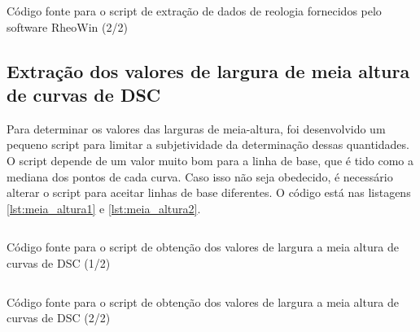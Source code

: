 \begin{listing}[H]
	\inputminted{python}{./python/extracao_reologia2.py}
	\caption{Código fonte para o script de extração de dados de reologia fornecidos pelo software RheoWin (2/2)} 
	\label{lst:extracao_reologia2}
\end{listing}

\subsection{Extração dos valores de largura de meia altura de curvas de DSC}
\label{sec:apendice_DSC}
Para determinar os valores das larguras de meia-altura, foi desenvolvido um pequeno script para limitar a subjetividade da determinação dessas quantidades. O script depende de um valor muito bom para a linha de base, que é tido como a mediana dos pontos de cada curva. Caso isso não seja obedecido, é necessário alterar o script para aceitar linhas de base diferentes. O código está nas listagens \ref{lst:meia_altura1} e \ref{lst:meia_altura2}.

\begin{listing}[H]
	\inputminted{python}{./python/meia_altura1.py}
	\caption{Código fonte para o script de obtenção dos valores de largura a meia altura de curvas de DSC (1/2)} 
	\label{lst:meia_altura1}
\end{listing}

\begin{listing}[H]
	\inputminted{python}{./python/meia_altura2.py}
	\caption{Código fonte para o script de obtenção dos valores de largura a meia altura de curvas de DSC (2/2)} 
	\label{lst:meia_altura2}
\end{listing}

%
%
%
%
%
%
%
